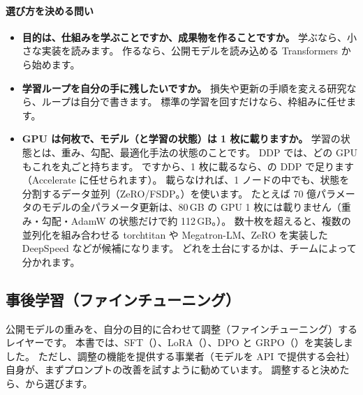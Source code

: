 \paragraph{選び方を決める問い}
\begin{itemize}[nosep,beginpenalty=10000]
\item \textbf{目的は、仕組みを学ぶことですか、成果物を作ることですか。}
  学ぶなら、小さな実装を読みます。
  作るなら、公開モデルを読み込める Transformers から始めます。
\item \textbf{学習ループを自分の手に残したいですか。}
  損失や更新の手順を変える研究なら、ループは自分で書きます。
  標準の学習を回すだけなら、枠組みに任せます。
\item \textbf{GPU は何枚で、モデル（と学習の状態）は 1 枚に載りますか。}
  学習の状態とは、重み、勾配、最適化手法の状態のことです。
  DDP では、どの GPU もこれを丸ごと持ちます。
  ですから、1 枚に載るなら、の DDP で足ります（Accelerate に任せられます）。
  載らなければ、1 ノードの中でも、状態を分割するデータ並列（ZeRO/FSDP。）を使います。
  たとえば 70 億パラメータのモデルの全パラメータ更新は、80\,GB の GPU 1 枚には載りません（重み・勾配・AdamW の状態だけで約 112\,GB。）。
  数十枚を超えると、複数の並列化を組み合わせる torchtitan や Megatron-LM、ZeRO を実装した DeepSpeed などが候補になります。
  どれを土台にするかは、チームによって分かれます。
\end{itemize}

\subsection{事後学習（ファインチューニング）}\label{sec:tm-post}

公開モデルの重みを、自分の目的に合わせて調整（ファインチューニング）するレイヤーです。
本書では、SFT（）、LoRA（）、DPO と GRPO（）を実装しました。
ただし、調整の機能を提供する事業者（モデルを API で提供する会社）自身が、まずプロンプトの改善を試すように勧めています。
調整すると決めたら、から選びます。

